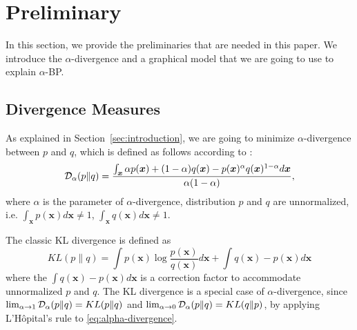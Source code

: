 \documentclass[conference,onecolumn]{IEEEtran}
\begin{document}





\section{Preliminary}\label{sec:preliminary}
In this section, we provide the preliminaries that are needed in this paper. We introduce the $\alpha$-divergence and a graphical model that we are going to use to explain $\alpha$-BP.

\subsection{Divergence Measures}
As explained in Section~\ref{sec:introduction}, we are going to minimize $\alpha$-divergence between $p$ and $q$, which is defined as follows according to \cite{Zhu95informationgeometric}\cite{divergence-measures-and-message-passing}: \\
\begin{equation}\label{eq:alpha-divergence}
  \mathcal{D}_{\alpha}(p \| q ) = \frac{\int_{\bm{x}} \alpha p(\bm{x}) + (1-\alpha) q (\bm{x}) - p(\bm{x})^{\alpha} q(\bm{x})^{1-\alpha} d\bm{x}}{\alpha(1-\alpha)},
\end{equation}
where $\alpha$ is the parameter of $\alpha$-divergence, distribution $p$ and $q$ are unnormalized, i.e. $\int_{\bm{x}}p(\bm{x}) d\bm{x} \neq 1$, $\int_{\bm{x}}q(\bm{x}) d\bm{x} \neq 1$.

The classic KL divergence is defined as
\begin{equation}
  KL(p \| q) = \int p(\bm{x}) \log{\frac{p(\bm{x})}{q(\bm{x})}} d \bm{x}+ \int q(\bm{x}) - p(\bm{x}) d\bm{x}
\end{equation}
where the $\int q(\bm{x}) - p(\bm{x}) d\bm{x}$ is a correction factor to accommodate unnormalized $p$ and $q$. The KL divergence is a special case of $\alpha$-divergence, since $\lim_{\alpha \rightarrow 1}\mathcal{D}_{\alpha}(p \| q ) = KL(p\|q)$ and $\lim_{\alpha \rightarrow 0}\mathcal{D}_{\alpha}(p \| q ) = KL(q\|p)$, by applying L'H\^opital's rule to \autoref{eq:alpha-divergence}.
\end{document}
